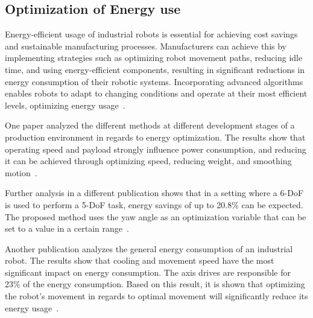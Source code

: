 \subsection{Optimization of Energy use}
Energy-efficient usage of industrial robots is essential for achieving cost savings and sustainable manufacturing processes. Manufacturers can achieve this by implementing strategies such as optimizing robot movement paths, reducing idle time, and using energy-efficient components, resulting in significant reductions in energy consumption of their robotic systems. Incorporating advanced algorithms enables robots to adapt to changing conditions and operate at their most efficient levels, optimizing energy usage~\cite{Uhlmann.2016}. 

One paper analyzed the different methods at different development stages of a production environment in regards to energy optimization. The results show that operating speed and payload strongly influence power consumption, and reducing it can be achieved through optimizing speed, reducing weight, and smoothing motion~\cite{Paryanto.2015}.

Further analysis in a different publication shows that in a setting where a 6-DoF is used to perform a 5-DoF task, energy savings of up to 20.8\% can be expected. The proposed method uses the yaw angle as an optimization variable that can be set to a value in a certain range~\cite{Boscariol.2020}. 

Another publication analyzes the general energy consumption of an industrial robot. The results show that cooling and movement speed have the most significant impact on energy consumption. The axis drives are responsible for 23\% of the energy consumption. Based on this result, it is shown that optimizing the robot's movement in regards to optimal movement will significantly reduce its energy usage~\cite{Uhlmann.2016}. 





